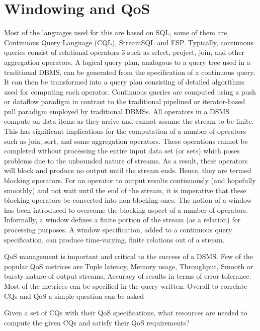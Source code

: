 \section{Windowing and QoS}
Most of the languages used for this are based on SQL, some of them are,  Continuous Query Language (CQL), StreamSQL and ESP. Typically, continuous queries consist of relational operators 3 such as select, project, join, and other aggregation operators. A logical query plan, analogous to a query tree used in a traditional DBMS, can be generated from the specification of a continuous query. It can then be transformed into a query plan consisting of detailed algorithms used for computing each operator. Continuous queries are computed using a push or dataflow paradigm in contrast to the traditional pipelined or iterator-based pull paradigm employed by traditional DBMSs. All operators in a DSMS compute on data items as they arrive and cannot assume the stream to be finite. This has significant implications for the computation of a number of operators such as join, sort, and some aggregation operators. These operations cannot be completed without processing the entire input data set (or sets) which poses problems due to the unbounded nature of streams. As a result, these operators will block and produce no output until the stream ends. Hence, they are termed blocking operators. For an operator to output results continuously (and hopefully smoothly) and not wait until the end of the stream, it is imperative that these blocking operators be converted into non-blocking ones. The notion of a window has been introduced to overcome the blocking aspect of a number of operators. Informally, a window defines a finite portion of the stream (as a relation) for processing purposes. A window specification, added to a continuous query specification, can produce time-varying, finite relations out of a stream.
\par QoS management is important and critical to the success of a DSMS. Few of the popular QoS metrices are Tuple latency, Memory usage, Throughput, Smooth or bursty nature of output streams, Accuracy of results in terms of error tolerance. Most of the metrices can be specified in the query written. Overall to correlate CQs and QoS a simple question can be asked 
\begin{center}
Given a set of CQs with their QoS specifications, what resources are needed to compute the given CQs and satisfy their QoS requirements?
\end{center}

